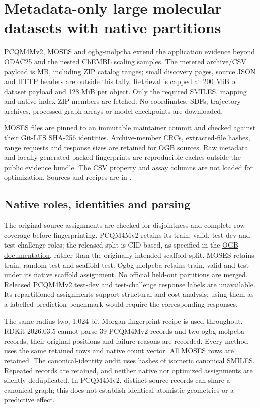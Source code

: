 \section{Metadata-only large molecular datasets with native partitions}

PCQM4Mv2, MOSES and ogbg-molpcba extend the application evidence beyond ODAC25
and the nested ChEMBL scaling samples. The metered archive/CSV payload is
\NativeMetadataMB{} MB, including ZIP catalog ranges; small discovery pages,
source JSON and HTTP headers are outside this tally. Retrieval is capped at
200 MiB of dataset payload and 128 MiB per object. Only the required SMILES,
mapping and native-index ZIP members are fetched. No coordinates, SDFs,
trajectory archives, processed graph arrays or model checkpoints are downloaded.

MOSES files are pinned to an immutable maintainer commit and checked against
their Git-LFS SHA-256 identities. Archive-member CRCs, extracted-file hashes,
range requests and response sizes are retained for OGB sources. Raw metadata
and locally generated packed fingerprints are reproducible caches outside the
public evidence bundle. The CSV property and assay columns are not loaded for
optimization. Sources and recipes are in .

\subsection{Native roles, identities and parsing}

The original source assignments are checked for disjointness and complete row
coverage before fingerprinting. PCQM4Mv2 retains its train, valid, test-dev and
test-challenge roles; the released split is CID-based, as specified in the
\href{https://ogb.stanford.edu/docs/lsc/pcqm4mv2/}{OGB documentation}, rather
than the originally intended scaffold split. MOSES retains train, random test
and scaffold test. Ogbg-molpcba retains train, valid and test under its native
scaffold assignment. No official held-out partitions are merged.
Released PCQM4Mv2 test-dev and test-challenge response labels are unavailable.
Its repartitioned assignments support structural and cost analysis; using them
as a labelled prediction benchmark would require the corresponding responses.

The same radius-two, 1,024-bit Morgan fingerprint recipe is used throughout.
RDKit 2026.03.5 cannot parse 39 PCQM4Mv2 records and two ogbg-molpcba records;
their original positions and failure reasons are recorded. Every method uses
the same retained rows and native count vector. All MOSES rows are retained.
The canonical-identity audit uses hashes of isomeric canonical SMILES. Repeated
records are retained, and neither native nor optimized assignments are silently
deduplicated. In PCQM4Mv2, distinct source records can share a canonical graph;
this does not establish identical atomistic geometries or a predictive effect.

